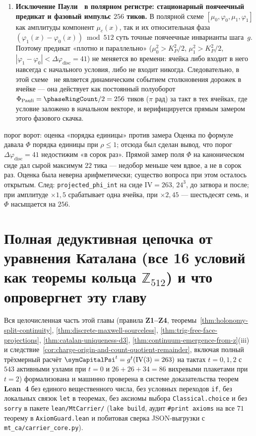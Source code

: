 \begin{enumerate}[leftmargin=*]
\item \textbf{Исключение Паули~ в полярном регистре: стационарный поячеечный предикат и фазовый импульс $256$ тиков.}
  В полярной схеме $[\mu_0,\varphi_0,\mu_1,\varphi_1]$ как амплитуды компонент $\mu_c(x)$, так и их относительная фаза $(\varphi_1(x)-\varphi_0(x))\bmod 512$ суть точные поячеечные инварианты шага~$g$.
  Поэтому предикат «плотно и параллельно» ($\mu_0^2 > K_P^2/2$, $\mu_1^2 > K_P^2/2$, $|\varphi_1-\varphi_0| < \Delta\varphi_{\mathrm{disc}}=41$) не меняется во времени: ячейка либо входит в него навсегда с начального условия, либо не входит никогда.
  Следовательно, в этой схеме~ не является динамическим событием столкновения дорожек в ячейке --- она действует как постоянный полуоборот $\Phi_{\mathrm{Pauli}} = \phaseRingCount/2 = 256$ тиков ($\pi$ рад) за такт в тех ячейках, где условие заложено в начальном векторе, и верифицируется прямым замером этого фазового скачка.
\end{enumerate}

\begin{deadend}{порог ворот: оценка «порядка единицы» против замера}
Оценка по формуле давала $\Phi$ порядка единицы при $\rho\le1$; отсюда был сделан вывод,
что порог $\Delta\varphi_{\mathrm{disc}}=41$ недостижим «в сорок раз».
Прямой замер поля $\Phi$ на каноническом сиде дал сырой максимум $22$ тика ---
недобор меньше чем вдвое, а не в сорок раз. Оценка была неверна арифметически;
существо вопроса при этом осталось открытым.
След: \texttt{projected\_phi\_int} на сиде $\mathrm{IV}=263$, $24^3$, до затвора
и после; при амплитуде $\times1{,}5$ срабатывает одна ячейка, при $\times2{,}45$ ---
шестьдесят семь, и $\Phi$ насыщается на $256$.
\end{deadend}

\section{Полная дедуктивная цепочка от уравнения Каталана (все 16 условий как теоремы кольца \texorpdfstring{$\mathbb{Z}_{512}$}{Z\_512}) и что опровергнет эту главу}

Вся целочисленная часть этой главы (правила \textbf{Z1--Z4}, теоремы~\ref{thm:holonomy-split-continuity}, \ref{thm:discrete-maxwell-sourceless}, \ref{thm:trig-free-face-projections}, \ref{thm:catalan-uniqueness-d3}, \ref{thm:continuum-emergence-from-z}(iii) и следствие~\ref{cor:charge-origin-and-count-quotient-remainder}, включая полный трёхмерный расчёт $\symCapitalPsi^t = g^t(\mathrm{IV}(3)=263)$ на тактах $t=0,1,2$ с $543$ активными узлами при $t=0$ и $26+26+34=86$ вихревыми плакетами при $t=2$) формализована и машинно проверена в системе доказательства теорем \textbf{Lean~4} без единого вещественного числа, без условных переходов \texttt{if}, без локальных связок \texttt{let} в теоремах, без аксиомы выбора \texttt{Classical.choice} и без \texttt{sorry} в пакете \texttt{lean/MtCarrier/} (\texttt{lake build}, аудит \texttt{\#print axioms} на все $71$ теорему в \texttt{AxiomGuard.lean} и побитовая сверка JSON-выгрузки с \texttt{mt\_ca/carrier\_core.py}).

